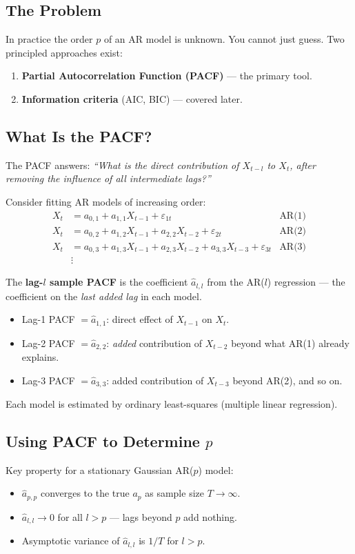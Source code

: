 \documentclass[11pt]{article}
\begin{document}
\subsection{The Problem}
In practice the order $p$ of an AR model is unknown. You cannot just guess.
Two principled approaches exist:
\begin{enumerate}
    \item \textbf{Partial Autocorrelation Function (PACF)} --- the primary tool.
    \item \textbf{Information criteria} (AIC, BIC) --- covered later.
\end{enumerate}

\subsection{What Is the PACF?}
The PACF answers: \textit{``What is the direct contribution of $X_{t-l}$ to $X_t$,
after removing the influence of all intermediate lags?''}

Consider fitting AR models of increasing order:
\begin{align*}
X_t &= a_{0,1} + a_{1,1}X_{t-1} + \varepsilon_{1t}                                      & \text{AR(1)}\\
X_t &= a_{0,2} + a_{1,2}X_{t-1} + a_{2,2}X_{t-2} + \varepsilon_{2t}                     & \text{AR(2)}\\
X_t &= a_{0,3} + a_{1,3}X_{t-1} + a_{2,3}X_{t-2} + a_{3,3}X_{t-3} + \varepsilon_{3t}   & \text{AR(3)}\\
&\vdots
\end{align*}

The \textbf{lag-$l$ sample PACF} is the coefficient $\hat{a}_{l,l}$ from the
AR($l$) regression --- the coefficient on the \emph{last added lag} in each model.

\begin{itemize}
    \item Lag-1 PACF $= \hat{a}_{1,1}$: direct effect of $X_{t-1}$ on $X_t$.
    \item Lag-2 PACF $= \hat{a}_{2,2}$: \emph{added} contribution of $X_{t-2}$
      beyond what AR(1) already explains.
    \item Lag-3 PACF $= \hat{a}_{3,3}$: added contribution of $X_{t-3}$ beyond
      AR(2), and so on.
\end{itemize}

Each model is estimated by ordinary least-squares (multiple linear regression).

\subsection{Using PACF to Determine $p$}
Key property for a stationary Gaussian AR($p$) model:
\begin{itemize}
    \item $\hat{a}_{p,p}$ converges to the true $a_p$ as sample size $T
      \to \infty$.
    \item $\hat{a}_{l,l} \to 0$ for all $l > p$ --- lags beyond $p$ add nothing.
    \item Asymptotic variance of $\hat{a}_{l,l}$ is $1/T$ for $l > p$.
\end{itemize}
\end{document}
